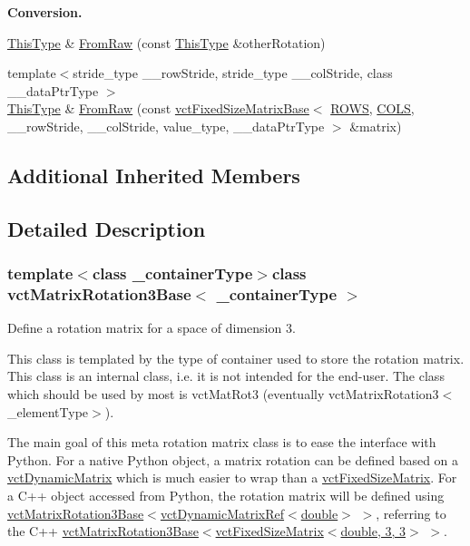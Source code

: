 \begin{Indent}{\bf Conversion.}
\begin{DoxyCompactItemize}
\item 
\hyperlink{classvct_matrix_rotation3_base_a027be766cb10ca3c2ad8e85c28ed0af9}{This\+Type} \& \hyperlink{classvct_matrix_rotation3_base_a84f558161357fe95d0b476ba404589f0}{From\+Raw} (const \hyperlink{classvct_matrix_rotation3_base_a027be766cb10ca3c2ad8e85c28ed0af9}{This\+Type} \&other\+Rotation)
\item 
{\footnotesize template$<$stride\+\_\+type \+\_\+\+\_\+row\+Stride, stride\+\_\+type \+\_\+\+\_\+col\+Stride, class \+\_\+\+\_\+data\+Ptr\+Type $>$ }\\\hyperlink{classvct_matrix_rotation3_base_a027be766cb10ca3c2ad8e85c28ed0af9}{This\+Type} \& \hyperlink{classvct_matrix_rotation3_base_a660c5afd554f60360ef013b3545a2e25}{From\+Raw} (const \hyperlink{classvct_fixed_size_matrix_base}{vct\+Fixed\+Size\+Matrix\+Base}$<$ \hyperlink{classvct_matrix_rotation3_base_abdf4d3751b8966af4ef69c15998d4115a262124a9ac112fef9aa619bd72e5c5f5}{R\+O\+W\+S}, \hyperlink{classvct_matrix_rotation3_base_abdf4d3751b8966af4ef69c15998d4115a55a02c6e4641f16f1c7ca8ba88e47d79}{C\+O\+L\+S}, \+\_\+\+\_\+row\+Stride, \+\_\+\+\_\+col\+Stride, value\+\_\+type, \+\_\+\+\_\+data\+Ptr\+Type $>$ \&matrix)
\end{DoxyCompactItemize}
\end{Indent}
\subsection*{Additional Inherited Members}


\subsection{Detailed Description}
\subsubsection*{template$<$class \+\_\+container\+Type$>$class vct\+Matrix\+Rotation3\+Base$<$ \+\_\+container\+Type $>$}

Define a rotation matrix for a space of dimension 3. 

This class is templated by the type of container used to store the rotation matrix. This class is an internal class, i.\+e. it is not intended for the end-\/user. The class which should be used by most is vct\+Mat\+Rot3 (eventually vct\+Matrix\+Rotation3$<$\+\_\+element\+Type$>$).

The main goal of this meta rotation matrix class is to ease the interface with Python. For a native Python object, a matrix rotation can be defined based on a \hyperlink{classvct_dynamic_matrix}{vct\+Dynamic\+Matrix} which is much easier to wrap than a \hyperlink{classvct_fixed_size_matrix}{vct\+Fixed\+Size\+Matrix}. For a C++ object accessed from Python, the rotation matrix will be defined using \hyperlink{classvct_matrix_rotation3_base}{vct\+Matrix\+Rotation3\+Base}$<$\hyperlink{classvct_dynamic_matrix_ref}{vct\+Dynamic\+Matrix\+Ref$<$double$>$} $>$, referring to the C++ \hyperlink{classvct_matrix_rotation3_base}{vct\+Matrix\+Rotation3\+Base}$<$\hyperlink{classvct_fixed_size_matrix}{vct\+Fixed\+Size\+Matrix$<$double, 3, 3$>$} $>$.


